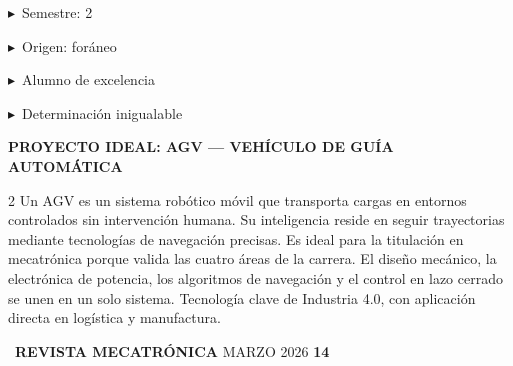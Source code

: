 \documentclass[10pt]{article}
\newcommand{\lineaGrisH}{%
  \noindent{\color{lineaGris}\rule{\linewidth}{0.4pt}}\par}
\newcommand{\itemSidebarV}[1]{%
  \vspace{2pt}\noindent
  \textcolor{verdeAccento}{\small$\blacktriangleright$}\,%
  {\footnotesize\color{grisTexto}#1}\par}
\newenvironment{cajaProyectoV}{%
  \begin{tcolorbox}[colback=verdeTech,colframe=verdeAccento,
    arc=0pt,boxrule=1pt,left=8pt,right=8pt,top=6pt,bottom=6pt]}%
  {\end{tcolorbox}}
\newenvironment{sidebarAzul}[1]{%
  \begin{tcolorbox}[colback=azulOscuro,colframe=azulOscuro,
    arc=0pt,boxrule=0pt,left=6pt,right=6pt,top=5pt,bottom=5pt]
  \noindent{\small\bfseries\color{blanco}#1}\par
  \noindent{\color{naranja}\rule{\linewidth}{1pt}}\par\vspace{2pt}}%
  {\end{tcolorbox}}
\newcommand{\pieRevista}[2]{%
  \vspace*{\fill}\vspace{3pt}%
  \lineaGrisH\vspace{3pt}%
  {\footnotesize%
    \colorbox{azulOscuro}{\textcolor{blanco}{\footnotesize\textbf{\quad[R]\quad}}}\,%
    \textcolor{blanco}{\textbf{REVISTA MECATR\'ONICA}}\hfill
    \textcolor{grisTexto}{MARZO 2026\quad}%
    \textcolor{#1}{\textbf{#2}}}}
\begin{document}
\begin{minipage}{\dimexpr\paperwidth-1.8cm}
\noindent
\begin{minipage}[t]{0.25\linewidth}\vspace{0pt}
\begin{sidebarAzul}{DATOS CLAVE}
\itemSidebarV{Semestre: 2\textordmasculine}
\itemSidebarV{Origen: for\'aneo}
\itemSidebarV{Alumno de excelencia}
\itemSidebarV{Determinaci\'on inigualable}
\end{sidebarAzul}
\end{minipage}%
\hspace{0.02\linewidth}%
\begin{minipage}[t]{0.73\linewidth}\vspace{0pt}
\begin{cajaProyectoV}
  {\small\bfseries\color{verdeAccento}
    PROYECTO IDEAL: AGV — VEH\'ICULO DE GU\'IA AUTOM\'ATICA}\par
  \vspace{3pt}{\color{verdeAccento}\rule{\linewidth}{0.5pt}}\par\vspace{4pt}
  \begin{multicols}{2}\footnotesize\color{grisTexto}\RaggedRight
  Un AGV es un sistema rob\'otico m\'ovil que transporta cargas
  en entornos controlados sin intervenci\'on humana. Su
  inteligencia reside en seguir trayectorias mediante tecnolog\'ias
  de navegaci\'on precisas. Es ideal para la titulaci\'on en
  mecatr\'onica porque valida las cuatro \'areas de la carrera.
  \columnbreak
  El dise\~no mec\'anico, la electr\'onica de potencia, los
  algoritmos de navegaci\'on y el control en lazo cerrado se
  unen en un solo sistema. Tecnolog\'ia clave de Industria 4.0,
  con aplicaci\'on directa en log\'istica y manufactura.
  \end{multicols}
\end{cajaProyectoV}
\end{minipage}
\vspace*{3.30cm}

\pieRevista{verdeAccento}{14}
\vspace*{0.30cm}
\end{minipage}

\clearpage
\restoregeometry
\pagestyle{fancy}


\clearpage
{}
\pagestyle{empty}
\AddToShipoutPictureBG*{%
  \AtPageLowerLeft{%
    \color{fondoOscuro}\rule{\paperwidth}{\paperheight}}}
\end{document}
